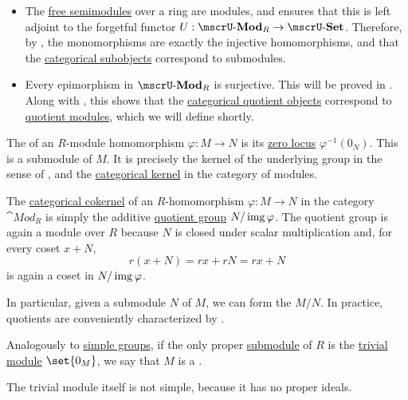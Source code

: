 \begin{definition}
\begin{thmenum}
\begin{itemize}
      \item The \hyperref[def:free_semimodule]{free semimodules} over a ring are modules, and  ensures that this is left adjoint to the forgetful functor \( U: \ucat{Mod}_R \to \ucat{Set} \). Therefore, by , the monomorphisms are exactly the injective homomorphisms, and that the \hyperref[def:subobject_and_quotient]{categorical subobjects} correspond to submodules.

      \item Every epimorphism in \( \ucat{Mod}_R \) is surjective. This will be proved in . Along with , this shows that the \hyperref[def:subobject_and_quotient]{categorical quotient objects} correspond to \hyperref[def:module/quotient]{quotient modules}, which we will define shortly.
    \end{itemize}

     The  of an \( R \)-module homomorphism \( \varphi: M \to N \) is its \hyperref[def:zero_locus]{zero locus} \( \varphi^{-1}(0_N) \). This is a submodule of \( M \). It is precisely the kernel of the underlying group in the sense of , and the \hyperref[def:zero_morphisms/cokernel]{categorical kernel} in the category of modules.

     The \hyperref[def:zero_morphisms/cokernel]{categorical cokernel} of an \( R \)-homomorphism \( \varphi: M \to N \) in the category \( \cat{Mod}_R \) is simply the additive \hyperref[def:group/quotient]{quotient group} \( N / \operatorname{img} \varphi \). The quotient group is again a module over \( R \) because \( N \) is closed under scalar multiplication and, for every coset \( x + N \),
    \begin{equation*}
      r(x + N) = rx + rN = rx + N
    \end{equation*}
    is again a coset in \( N / \operatorname{img} \varphi \).

    In particular, given a submodule \( N \) of \( M \), we can form the  \( M / N \). In practice, quotients are conveniently characterized by .

     Analogously to \hyperref[def:group/simple]{simple groups}, if the only proper \hyperref[def:module/submodel]{submodule} of \( R \) is the \hyperref[def:module/trivial]{trivial module} \( \set{ 0_M } \), we say that \( M \) is a .

    The trivial module itself is not simple, because it has no proper ideals.
  \end{thmenum}
\end{definition}

